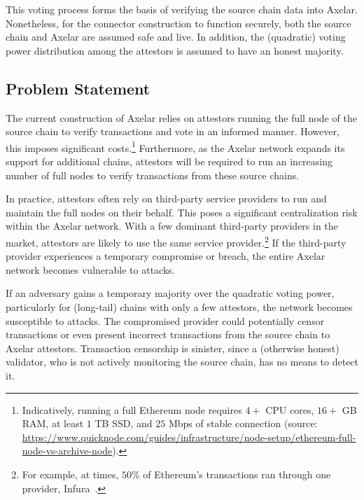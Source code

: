 This voting process forms the basis of verifying the source chain data into Axelar.
Nonetheless, for the connector construction to function securely, both the source chain and Axelar are assumed safe and live. In addition, the (quadratic) voting power distribution among the attestors is assumed to have an honest majority.

\subsection{Problem Statement}
The current construction of Axelar relies on attestors running the full node of the source chain to verify transactions and vote in an informed manner. However, this imposes significant costs.\footnote{Indicatively, running a full Ethereum node requires $4+$ CPU cores, $16+$ GB RAM, at least $1$ TB SSD, and $25$ Mbps of stable connection (source: \url{https://www.quicknode.com/guides/infrastructure/node-setup/ethereum-full-node-vs-archive-node}).}
Furthermore, as the Axelar network expands its support for additional chains, attestors will be required to run an increasing number of full nodes to verify transactions from these source chains.

In practice, attestors often rely on third-party service providers to run and maintain the full nodes on their behalf. 
% 
This poses a significant centralization risk within the Axelar network. With a few dominant third-party providers in the market, attestors are likely to use the same service provider.\footnote{For example, at times, $50$\% of Ethereum's transactions ran through one provider, Infura~\cite{infura}.} If the third-party provider experiences a temporary compromise or breach, the entire Axelar network becomes vulnerable to attacks. 

If an adversary gains a temporary majority over the quadratic voting power, particularly for (long-tail) chains with only a few attestors, the network becomes susceptible to attacks. The compromised provider could potentially censor transactions or even present incorrect transactions from the source chain to Axelar attestors. Transaction censorship is sinister, since a (otherwise honest) validator, who is not actively monitoring the source chain, has no means to detect it. 

